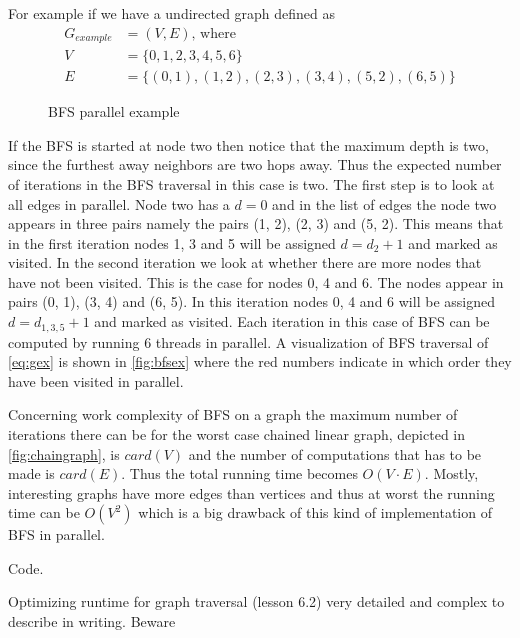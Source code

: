 For example if we have a undirected graph defined as
\begin{align}
	G_{example} &= (V, E) \text{, where}   \label{eq:gex}\\
			  V &= \{0, 1, 2, 3, 4, 5, 6\} \\
			  E &= \{(0, 1), (1, 2), (2, 3), (3, 4), (5, 2), (6, 5) \}
\end{align}
\begin{figure}
	\centering
	\caption{BFS parallel example} 
	\label{fig:bfsex}
\end{figure}
If the BFS is started at node two then notice that the maximum depth is two, since the furthest away neighbors are two hops away.
Thus the expected number of iterations in the BFS traversal in this case is two.
The first step is to look at all edges in parallel.
Node two has a $d=0$ and in the list of edges the node two appears in three pairs namely the pairs (1, 2), (2, 3) and (5, 2).
This means that in the first iteration nodes 1, 3 and 5 will be assigned $d = d_{2} + 1$ and marked as visited.
In the second iteration we look at whether there are more nodes that have not been visited.
This is the case for nodes 0, 4 and 6.
The nodes appear in pairs (0, 1), (3, 4) and (6, 5).
In this iteration nodes 0, 4 and 6 will be assigned $d = d_{1, 3, 5} + 1$ and marked as visited.
Each iteration in this case of BFS can be computed by running 6 threads in parallel.
A visualization of BFS traversal of \autoref{eq:gex} is shown in \autoref{fig:bfsex} where the red numbers indicate in which order they have been visited in parallel.

Concerning work complexity of BFS on a graph the maximum number of iterations there can be for the worst case chained linear graph, depicted in \autoref{fig:chaingraph}, is $card(V)$ and the number of computations that has to be made is $card(E)$.
Thus the total running time becomes $O(V\cdot E)$.
Mostly, interesting graphs have more edges than vertices and thus at worst the running time can be $O(V^2)$ which is a big drawback of this kind of implementation of BFS in parallel.

\begin{itemizeSmall}
	\item Code.
	\item Optimizing runtime for graph traversal (lesson 6.2) very detailed and complex to describe in writing. Beware
\end{itemizeSmall}
